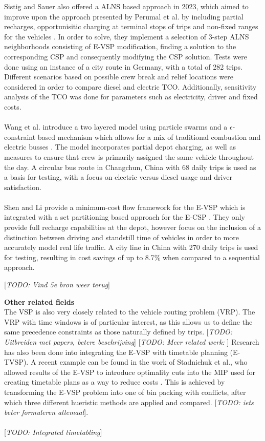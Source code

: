 \documentclass[ht]{article}
\newcommand{\todo}[1]{{\color{red}[\textit{TODO: #1}]}}
\begin{document}
Sistig and Sauer also offered a ALNS based approach in 2023, which aimed to improve upon the approach presented by Perumal et al. by including partial recharges, opportunisitic charging at terminal stops of trips and non-fixed ranges for the vehicles \cite{Sistig2023}. In order to solve, they implement a selection of 3-step ALNS neighborhoods consisting of E-VSP modification, finding a solution to the corresponding CSP and consequently modifying the CSP solution. Tests were done using an instance of a city route in Germany, with a total of 282 trips. Different scenarios based on possible crew break and relief locations were considered in order to compare diesel and electric TCO. Additionally, sensitivity analysis of the TCO was done for parameters such as electricity, driver and fixed costs. \\\\

Wang et al. introduce a two layered model using particle swarms and a $\epsilon$-constraint based mechanism which allows for a mix of traditional combustion and electric busses \cite{Wang2022}. The model incorporates partial depot charging, as well as measures to ensure that crew is primarily assigned the same vehicle throughout the day. A circular bus route in Changchun, China with 68 daily trips is used as a basis for testing, with a focus on electric versus diesel usage and driver satisfaction. \\\\

Shen and Li provide a minimum-cost flow framework for the E-VSP which is integrated with a set partitioning based approach for the E-CSP \cite{Shen2023}. They only provide full recharge capabilities at the depot, however focus on the inclusion of a distinction between driving and standstill time of vehicles in order to more accurately model real life traffic. A city line in China with 270 daily trips is used for testing, resulting in cost savings of up to 8.7\% when compared to a sequential approach.

\todo{Vind 5e bron weer terug}

\noindent \textbf{Other related fields}\\
The VSP is also very closely related to the vehicle routing problem (VRP). The VRP with time windows is of particular interest, as this allows us to define the same precedence constraints as those naturally defined by trips. \todo{Uitbreiden met papers, betere beschrijving}
\todo{Meer related werk: }
Research has also been done into integrating the E-VSP with timetable planning (E-TVSP). A recent example can be found in the work of Stadnichuk et al., who allowed results of the E-VSP to introduce optimality cuts into the MIP used for creating timetable plans as a way to reduce costs \cite{Stadnichuk2024}. This is achieved by transforming the E-VSP problem into one of bin packing with conflicts, after which three different hueristic methods are applied and compared. \todo{iets beter formuleren allemaal}. \\\\
\todo{Integrated timetabling} \cite{Stadnichuk2024}
\end{document}
